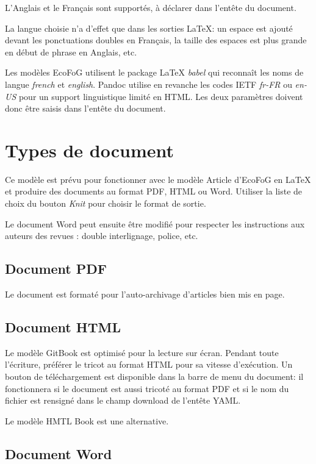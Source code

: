 \documentclass[fleqn,10pt]{ArtEcoFoG} %
\begin{document}
L'Anglais et le Français sont supportés, à déclarer dans l'entête du document.

La langue choisie n'a d'effet que dans les sorties LaTeX: un espace est ajouté devant les ponctuations doubles en Français, la taille des espaces est plus grande en début de phrase en Anglais, etc.

Les modèles EcoFoG utilisent le package LaTeX \emph{babel} qui reconnaît les noms de langue \emph{french} et \emph{english}.
Pandoc utilise en revanche les codes IETF \emph{fr-FR} ou \emph{en-US} pour un support linguistique limité en HTML.
Les deux paramètres doivent donc être saisis dans l'entête du document.

\hypertarget{types-de-document}{%
\section{Types de document}\label{types-de-document}}

Ce modèle est prévu pour fonctionner avec le modèle Article d'EcoFoG en LaTeX et produire des documents au format PDF, HTML ou Word.
Utiliser la liste de choix du bouton \emph{Knit} pour choisir le format de sortie.

Le document Word peut ensuite être modifié pour respecter les instructions aux auteurs des revues : double interlignage, police, etc.

\hypertarget{document-pdf}{%
\subsection{Document PDF}\label{document-pdf}}

Le document est formaté pour l'auto-archivage d'articles bien mis en page.

\hypertarget{document-html}{%
\subsection{Document HTML}\label{document-html}}

Le modèle GitBook est optimisé pour la lecture sur écran.
Pendant toute l'écriture, préférer le tricot au format HTML pour sa vitesse d'exécution.
Un bouton de téléchargement est disponible dans la barre de menu du document: il fonctionnera si le document est aussi tricoté au format PDF et si le nom du fichier est rensigné dans le champ download de l'entête YAML.

Le modèle HMTL Book est une alternative.

\hypertarget{document-word}{%
\subsection{Document Word}\label{document-word}}
\end{document}
